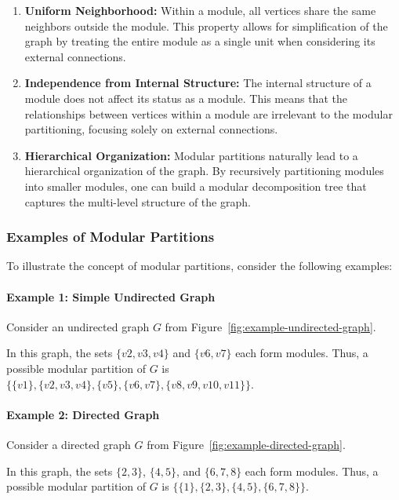 \begin{enumerate}
    \item \textbf{Uniform Neighborhood:} Within a module, all vertices share the same neighbors outside the module.
    This property allows for simplification of the graph by treating the entire module as a single unit when considering its external connections.
    \item \textbf{Independence from Internal Structure:} The internal structure of a module does not affect its status as a module.
    This means that the relationships between vertices within a module are irrelevant to the modular partitioning, focusing solely on external connections.
    \item \textbf{Hierarchical Organization:} Modular partitions naturally lead to a hierarchical organization of the graph.
    By recursively partitioning modules into smaller modules, one can build a modular decomposition tree that captures the multi-level structure of the graph.
\end{enumerate}

\subsubsection*{Examples of Modular Partitions}

To illustrate the concept of modular partitions, consider the following examples:

\paragraph*{Example 1: Simple Undirected Graph}

Consider an undirected graph $G$ from Figure~\ref{fig:example-undirected-graph}.

In this graph, the sets $\{v2, v3, v4\}$ and $\{v6, v7\}$ each form modules.
Thus, a possible modular partition of $G$ is $\{\{v1\}, \{v2, v3, v4\}, \{v5\}, \{v6, v7\}, \{v8, v9, v10, v11\}\}$.

\paragraph*{Example 2: Directed Graph}

Consider a directed graph $G$ from Figure~\ref{fig:example-directed-graph}.

In this graph, the sets $\{2, 3\}$, $\{4, 5\}$, and $\{6, 7, 8\}$ each form modules.
Thus, a possible modular partition of $G$ is $\{\{1\}, \{2, 3\}, \{4, 5\}, \{6, 7, 8\}\}$.

